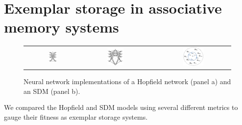\documentclass[10pt,letterpaper]{article}
\begin{document}
\section{Exemplar storage in associative memory systems}

\begin{figure}[t!]
  \begin{center}
    \begin{tabular}{lclclc}
      \raisebox{2.0in}{(a)} &
      \includegraphics[width=0.24\textwidth]{./figures/hopfieldNetwork.png} &
      \raisebox{2.0in}{(b)} &
      \includegraphics[width=0.27\textwidth]{./figures/sdmNetwork.png} &
      \raisebox{2.0in}{(c)} &
      \includegraphics[width=0.29\textwidth]{./figures/sdmOperations.png}
    \end{tabular}
    \caption{Neural network implementations of a Hopfield network
      (panel a) and an SDM (panel b).}
    \label{neuralNets}
  \end{center}
\end{figure}

We compared the Hopfield and SDM models using several different
metrics to gauge their fitness as exemplar storage systems.
\end{document}
